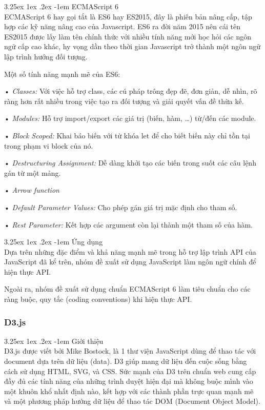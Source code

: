 \documentclass[12pt,a4paper]{article}
\makeatletter
\newcommand{\myparagraph}[1]{\paragraph{#1}\mbox{}\\} %
\renewcommand\paragraph{\@startsection{paragraph}{5}{\z@}%
  {3.25ex \@plus1ex \@minus.2ex}%
  {-1em}%
  {\normalfont\normalsize\bfseries}}
\makeatother
\begin{document}
\myparagraph{ECMAScript 6}
ECMAScript 6 hay gọi tắt là ES6 hay ES2015, đây là phiên bản nâng cấp, tập hợp các kỹ năng nâng cao của Javascript. ES6 ra đời năm 2015 nên cái tên ES2015 được lấy làm tên chính thức với nhiều tính năng mới học hỏi các ngôn ngữ cấp cao khác, hy vọng dần theo thời gian Javascript trở thành một ngôn ngữ lập trình hướng đối tượng.

Một số tính năng mạnh mẽ của ES6:
\begin{list}{}{}
\item[•] \emph{Classes:} Với việc hỗ trợ class, các cú pháp trông đẹp đẽ, đơn giản, dễ nhìn, rõ ràng hơn rất nhiều  trong việc tạo ra đối tượng và giải quyết vấn đề thừa kế.
\item[•] \emph{Modules:} Hỗ trợ import/export các giá trị (biến, hàm, …) từ/đến các module.
\item[•] \emph{Block Scoped:} Khai báo biến với từ khóa let để cho biết biến này chỉ tồn tại trong phạm vi block của nó.
\item[•] \emph{Destructuring Assignment:} Dễ dàng khởi tạo các biến trong suốt các câu lệnh gán từ một mảng.
\item[•] \emph{Arrow function}
\item[•] \emph{Default Parameter Values:} Cho phép gán giá trị mặc định cho tham số.
\item[•] \emph{Rest Parameter:} Kết hợp các argument còn lại thành một tham số của hàm.
\end{list}

\myparagraph{Ứng dụng}
Dựa trên những đặc điểm và khả năng mạnh mẽ trong hỗ trợ lập trình API của JavaScript đã kể trên, nhóm đề xuất sử dụng JavaScript làm ngôn ngữ chính để hiện thực API.

Ngoài ra, nhóm đề xuất sử dụng chuẩn ECMAScript 6 làm tiêu chuẩn cho các ràng buộc, quy tắc (coding conventions) khi hiện thực API.
\subsubsection{D3.js}
\myparagraph{Giới thiệu}
D3.js được viết bởi Mike Bostock, là 1 thư viện JavaScript dùng để thao tác với document dựa trên dữ liệu (data). D3 giúp mang dữ liệu đến cuộc sống bằng cách sử dụng HTML, SVG, và CSS. Sức mạnh của D3 trên chuẩn web cung cấp đầy đủ các tính năng của những trình duyệt hiện đại mà không buộc mình vào một khuôn khổ nhất định nào, kết hợp với các thành phần trực quan mạnh mẽ và một phương pháp hướng dữ liệu để thao tác DOM (Document Object Model).
\end{document}
